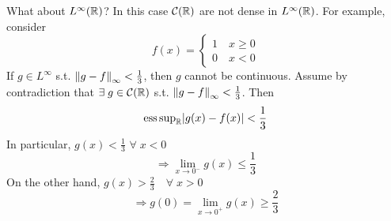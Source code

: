 What about \(L^\infty(\mathbb{R})\)? In this case \(\mathcal{C}(\mathbb{R})\) are not dense in \(L^\infty(\mathbb{R})\).
For example, consider 
\[
    f(x) =
    \begin{cases}
        1 \quad x \geq 0
        \\ 0 \quad x<0
    \end{cases}
\] 
If \(g \in L^\infty\) s.t. \(\norm{g-f}_\infty < \frac{1}{3}\), then \(g\) cannot be continuous. Assume by contradiction that \(\exists \; g \in \mathcal{C}(\mathbb{R})\) s.t. \(\norm{g-f}_\infty < \frac{1}{3}\). Then
\[
    \text{ess}\, \text{sup} _{\mathbb{R}} \abs{g(x)- f(x)} < \frac{1}{3}
\]
In particular, \(g(x) < \frac{1}{3}\) \(\forall \; x<0\)
\[
    \Rightarrow \lim_{x \to 0^-} g(x) \leq \frac{1}{3}
\]
On the other hand, \(g(x) > \frac{2}{3} \quad \forall \; x >0\)
\[
    \Rightarrow g(0)=\lim_{x \to 0^+} g(x) \geq \frac{2}{3}
\]